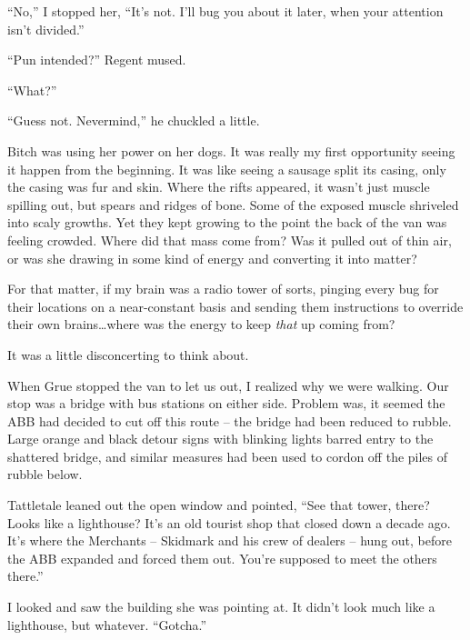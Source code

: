 ``No,'' I stopped her, ``It's not.  I'll bug you about it later, when your attention isn't divided.''



``Pun intended?'' Regent mused.



``What?''



``Guess not.  Nevermind,'' he chuckled a little.



Bitch was using her power on her dogs.  It was really my first opportunity seeing it happen from the beginning.  It was like seeing a sausage split its casing, only the casing was fur and skin.  Where the rifts appeared, it wasn't just muscle spilling out, but spears and ridges of bone.  Some of the exposed muscle shriveled into scaly growths.  Yet they kept growing to the point the back of the van was feeling crowded.  Where did that mass come from?  Was it pulled out of thin air, or was she drawing in some kind of energy and converting it into matter?



For that matter, if my brain was a radio tower of sorts, pinging every bug for their locations on a near-constant basis and sending them instructions to override their own brains\ldots where was the energy to keep \emph{that} up coming from?



It was a little disconcerting to think about.



When Grue stopped the van to let us out, I realized why we were walking.  Our stop was a bridge with bus stations on either side.  Problem was, it seemed the ABB had decided to cut off this route – the bridge had been reduced to rubble.  Large orange and black detour signs with blinking lights barred entry to the shattered bridge, and similar measures had been used to cordon off the piles of rubble below.



Tattletale leaned out the open window and pointed, ``See that tower, there?  Looks like a lighthouse?  It's an old tourist shop that closed down a decade ago.  It's where the Merchants – Skidmark and his crew of dealers – hung out, before the ABB expanded and forced them out.  You're supposed to meet the others there.''



I looked and saw the building she was pointing at.  It didn't look much like a lighthouse, but whatever.  ``Gotcha.''



